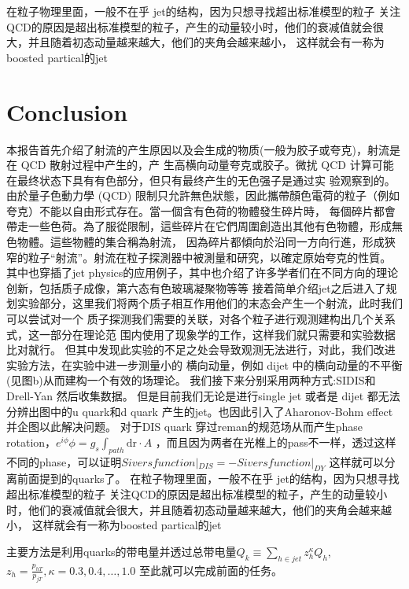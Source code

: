 \documentclass[12pt, a4paper, oneside]{ctexart}
\begin{document}
\begin{spacing}{2.0}
在粒子物理里面，一般不在乎 jet的结构，因为只想寻找超出标准模型的粒子
关注QCD的原因是超出标准模型的粒子，产生的动量较小时，他们的衰减值就会很大，并且随着初态动量越来越大，他们的夹角会越来越小，
这样就会有一称为boosted partical的jet


\section{Conclusion}
本报告首先介绍了射流的产生原因以及会生成的物质(一般为胶子或夸克)，射流是在 QCD 散射过程中产生的，产
生高横向动量夸克或胶子。微扰 QCD 计算可能在最终状态下具有有色部分，但只有最终产生的无色强子是通过实
验观察到的。
由於量子色動力學 (QCD) 限制只允許無色狀態，因此攜帶顏色電荷的粒子（例如夸克）不能以自由形式存在。當一個含有色荷的物體發生碎片時，
每個碎片都會帶走一些色荷。為了服從限制，這些碎片在它們周圍創造出其他有色物體，形成無色物體。這些物體的集合稱為射流，
因為碎片都傾向於沿同一方向行進，形成狹窄的粒子“射流”。射流在粒子探測器中被測量和研究，以確定原始夸克的性質。
其中也穿插了jet physics的应用例子，其中也介绍了许多学者们在不同方向的理论创新，包括质子成像，第六态有色玻璃凝聚物等等
接着简单介绍jet之后进入了规划实验部分，这里我们将两个质子相互作用他们的末态会产生一个射流，此时我们可以尝试对一个
质子探测我们需要的关联，对各个粒子进行观测建构出几个关系式，这一部分在理论范
围内使用了现象学的工作，这样我们就只需要和实验数据比对就行。
但其中发现此实验的不足之处会导致观测无法进行，对此，我们改进实验方法，在实验中进一步测量小的
横向动量，例如 dijet 中的横向动量的不平衡(见图b)从而建构一个有效的场理论。
我们接下来分别采用两种方式:SIDIS和Drell-Yan 然后收集数据。
但是目前我们无论是进行single jet 或者是 dijet 都无法分辨出图中的u quark和d
quark 产生的jet。也因此引入了Aharonov-Bohm effect并企图以此解决问题。
对于DIS quark 穿过reman的规范场从而产生phase rotation，$e^{i\phi}$$\phi = g_s \int_{path} \mathrm{d r}\cdot A$
，而且因为两者在光椎上的pass不一样，透过这样不同的phase，可以证明$Sivers function|_{DIS} = -Sivers function|_{DY}$
这样就可以分离前面提到的quarks了。
在粒子物理里面，一般不在乎 jet的结构，因为只想寻找超出标准模型的粒子
关注QCD的原因是超出标准模型的粒子，产生的动量较小时，他们的衰减值就会很大，并且随着初态动量越来越大，他们的夹角会越来越小，
这样就会有一称为boosted partical的jet

主要方法是利用quarks的带电量并透过总带电量$Q_k \equiv \sum_{h\in jet}z^{\kappa}_hQ_h$, $z_h = \frac{p_{hT}}{p_{jT}},\kappa = 0.3,0.4,\dots,1.0$
至此就可以完成前面的任务。



\end{spacing}



\end{document}
